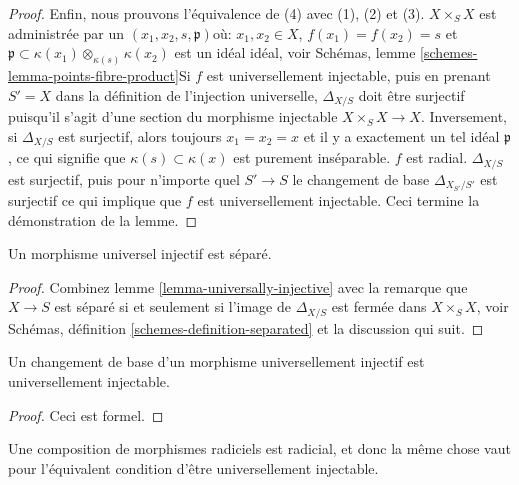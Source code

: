 \begin{proof}
Enfin, nous prouvons l'équivalence de (4) avec (1), (2) et (3). $X \times_S X$ est administrée par un
$(x_1, x_2, s, \mathfrak p)$où: $x_1, x_2 \in X$,
$f(x_1) = f(x_2) = s$ et
$\mathfrak p \subset \kappa(x_1) \otimes_{\kappa(s)} \kappa(x_2)$
est un idéal idéal, voir Schémas, lemme \ref{schemes-lemma-points-fibre-product}Si $f$ est universellement injectable, puis en prenant $S'=X$ dans la définition de l'injection universelle,
$\Delta_{X/S}$ doit être surjectif puisqu'il s'agit d'une section du morphisme injectable
$X \times_S X  \longrightarrow X$. Inversement, si
$\Delta_{X/S}$ est surjectif, alors toujours $x_1 = x_2 = x$ et il y a exactement un tel idéal $\mathfrak p$, ce qui signifie que
$\kappa(s) \subset \kappa(x)$ est purement inséparable. $f$ est radial. $\Delta_{X/S}$ est surjectif, puis pour n'importe quel $S' \to S$ le changement de base $\Delta_{X_{S'}/S'}$ est surjectif ce qui implique que $f$
est universellement injectable. Ceci termine la démonstration de la lemme.

\end{proof}

\begin{lemma}

\label{lemma-universally-injective-separated}
Un morphisme universel injectif est séparé.
\end{lemma}

\begin{proof}
Combinez lemme \ref{lemma-universally-injective} avec la remarque que $X \to S$ est séparé si et seulement si l'image de $\Delta_{X/S}$ est fermée dans $X \times_S X$, voir Schémas, définition \ref{schemes-definition-separated} et la discussion qui suit.
\end{proof}

\begin{lemma}

\label{lemma-base-change-universally-injective}

Un changement de base d'un morphisme universellement injectif est universellement injectable.

\end{lemma}

\begin{proof}
Ceci est formel.
\end{proof}

\begin{lemma}

\label{lemma-composition-universally-injective}

Une composition de morphismes radiciels est radicial, et donc la même chose vaut pour l'équivalent condition d'être universellement injectable.

\end{lemma}

